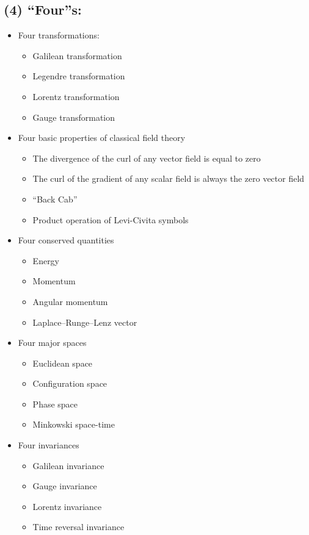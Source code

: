 \subsection*{(4) ``Four''s:}\label{fours}

\begin{itemize}
\tightlist{}
\item
  Four transformations:

  \begin{itemize}
\tightlist{}
  \item
    Galilean transformation
  \item
    Legendre transformation
  \item
    Lorentz transformation
  \item
    Gauge transformation
  \end{itemize}
\item
  Four basic properties of classical field theory

  \begin{itemize}
\tightlist{}
  \item
    The divergence of the curl of any vector field is equal to zero
  \item
    The curl of the gradient of any scalar field is always the zero
    vector field
  \item
    ``Back Cab''
  \item
    Product operation of Levi-Civita symbols
  \end{itemize}
\item
  Four conserved quantities

  \begin{itemize}
\tightlist{}
  \item
    Energy
  \item
    Momentum
  \item
    Angular momentum
  \item
    Laplace--Runge--Lenz vector
  \end{itemize}
\item
  Four major spaces

  \begin{itemize}
\tightlist{}
  \item
    Euclidean space
  \item
    Configuration space
  \item
    Phase space
  \item
    Minkowski space-time
  \end{itemize}
\item
  Four invariances

  \begin{itemize}
\tightlist{}
  \item
    Galilean invariance
  \item
    Gauge invariance
  \item
    Lorentz invariance
  \item
    Time reversal invariance
  \end{itemize}
\end{itemize}

